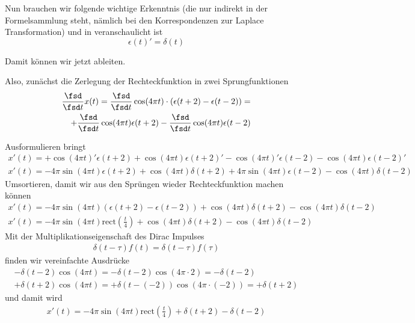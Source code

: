 \begin{ExCalc}
Nun brauchen wir folgende wichtige Erkenntnis (die nur indirekt in der Formelsammlung
steht, nämlich bei den Korrespondenzen zur Laplace Transformation) und in
 veranschaulicht ist
\begin{equation}
  \epsilon(t)' = \delta(t)
\end{equation}

Damit können wir jetzt ableiten.

Also, zunächst die Zerlegung der Rechteckfunktion in zwei Sprungfunktionen
\begin{align}
\frac{\fsd }{\fsd t} x(t) =
\frac{\fsd }{\fsd t} \cos(4\pi t) \cdot \left( \epsilon(t+2) -\epsilon(t-2)\right)=\\
+ \frac{\fsd }{\fsd t} \cos(4\pi t) \epsilon(t+2)
- \frac{\fsd }{\fsd t} \cos(4\pi t) \epsilon(t-2)
\end{align}

Ausformulieren bringt
\begin{align}x'(t)=
+ \cos(4\pi t)' \epsilon(t+2) + \cos(4\pi t) \epsilon(t+2)'
- \cos(4\pi t)' \epsilon(t-2) - \cos(4\pi t) \epsilon(t-2)'
\end{align}
\begin{align}x'(t)=
- 4\pi\sin(4\pi t) \epsilon(t+2) + \cos(4\pi t) \delta(t+2)
+ 4\pi\sin(4\pi t) \epsilon(t-2) - \cos(4\pi t) \delta(t-2)
\end{align}
Umsortieren, damit wir aus den Sprüngen wieder Rechteckfunktion machen können
\begin{align}x'(t)=
- 4\pi\sin(4\pi t) (\epsilon(t+2) - \epsilon(t-2))
+ \cos(4\pi t) \delta(t+2)
- \cos(4\pi t) \delta(t-2)
\end{align}
\begin{align}x'(t)=
- 4\pi\sin(4\pi t) \mathrm{rect}(\frac{t}{4})
+ \cos(4\pi t) \delta(t+2)
- \cos(4\pi t) \delta(t-2)
\end{align}
Mit der Multiplikationseigenschaft des Dirac Impulses
\begin{align}
\delta(t-\tau) f(t) = \delta(t-\tau) f(\tau)
\end{align}
finden wir vereinfachte Ausdrücke
\begin{align}
- \delta(t-2) \cos(4\pi t) = - \delta(t-2) \cos(4\pi \cdot 2) = - \delta(t-2)\\
+ \delta(t+2) \cos(4\pi t) = + \delta(t-(-2)) \cos(4\pi \cdot (-2)) = + \delta(t+2)
\end{align}
und damit wird
\begin{align}x'(t)=
- 4\pi\sin(4\pi t) \mathrm{rect}(\frac{t}{4})
+ \delta(t+2)
- \delta(t-2)
\end{align}
\end{ExCalc}

